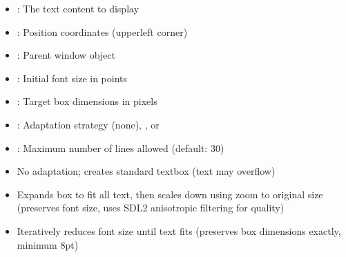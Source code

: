 \documentclass[letterpaper,10pt,english]{sphinxmanual}
\begin{document}
\sphinxAtStartPar
{}
\begin{itemize}
\item {} 
\sphinxAtStartPar
{}: The text content to display

\item {} 
\sphinxAtStartPar
{}: Position coordinates (upper\sphinxhyphen{}left corner)

\item {} 
\sphinxAtStartPar
{}: Parent window object

\item {} 
\sphinxAtStartPar
{}: Initial font size in points

\item {} 
\sphinxAtStartPar
{}: Target box dimensions in pixels

\item {} 
\sphinxAtStartPar
{}: Adaptation strategy \sphinxhyphen{}  (none), , or 

\item {} 
\sphinxAtStartPar
{}: Maximum number of lines allowed (default: 30)

\end{itemize}

\sphinxAtStartPar
{}
\begin{itemize}
\item {} 
\sphinxAtStartPar
{} \sphinxhyphen{} No adaptation; creates standard textbox (text may overflow)

\item {} 
\sphinxAtStartPar
{} \sphinxhyphen{} Expands box to fit all text, then scales down using zoom to original size (preserves font size, uses SDL2 anisotropic filtering for quality)

\item {} 
\sphinxAtStartPar
{} \sphinxhyphen{} Iteratively reduces font size until text fits (preserves box dimensions exactly, minimum 8pt)

\end{itemize}

\sphinxAtStartPar
{}
\end{document}
